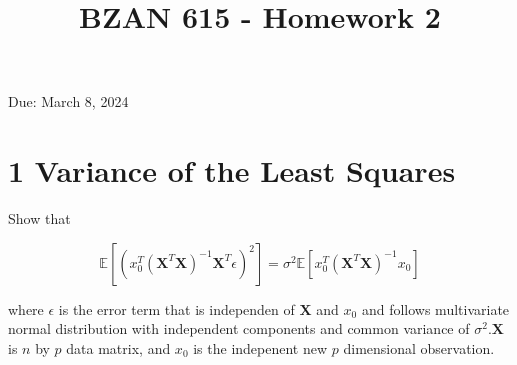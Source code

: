 \documentclass[10pt]{article}
\title{BZAN 615 - Homework 2 }
\author{}
\date{}
\begin{document}
\maketitle
Due: March 8, 2024

\section*{1 Variance of the Least Squares}
Show that

$$
\mathbb{E}\left[\left(x_{0}^{T}\left(\mathbf{X}^{T} \mathbf{X}\right)^{-1} \mathbf{X}^{T} \epsilon\right)^{2}\right]=\sigma^{2} \mathbb{E}\left[x_{0}^{T}\left(\mathbf{X}^{T} \mathbf{X}\right)^{-1} x_{0}\right]
$$

where $\epsilon$ is the error term that is independen of $\mathbf{X}$ and $x_{0}$ and follows multivariate normal distribution with independent components and common variance of $\sigma^{2} . \mathbf{X}$ is $n$ by $p$ data matrix, and $x_{0}$ is the indepenent new $p$ dimensional observation.
\end{document}
